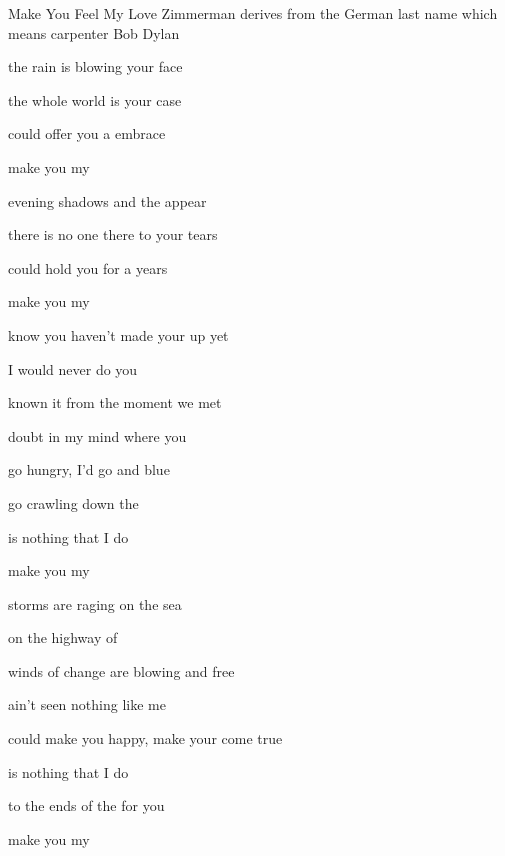 \begin{SBSong}{Make You Feel My Love}
  {Zimmerman derives from the German last name which means carpenter}
  {Bob Dylan}
  \begin{SBVerse} 
     the rain is blowing  your face
    
     the whole world is  your case
    
     could offer you a  embrace
    
     make you  my 
  \end{SBVerse}
  \begin{SBVerse}
     evening shadows and the  appear
    
     there is no one there to  your tears
    
     could hold you for a  years
    
     make you  my 

     know you haven't made your  up yet
    
     I would never do you 
    
     known it from the moment  we met
    
     doubt in my mind where you 
  \end{SBVerse}
  \begin{SBVerse}
     go hungry, I'd go  and blue
    
     go crawling down the 
    
     is nothing that I  do
    
     make you  my 

     storms are raging on the  sea
    
     on the highway of 
    
     winds of change are blowing  and free
    
     ain't seen nothing like me 
  \end{SBVerse}
  \begin{SBVerse}
     could make you happy, make your  come true
    
     is nothing that I  do
    
     to the ends of the  for you
    
     make you  my 
  \end{SBVerse}
\end{SBSong}
